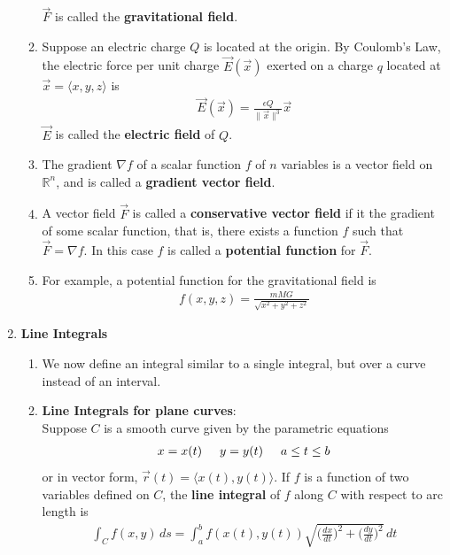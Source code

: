 \documentclass[10pt]{article}
\begin{document}
\begin{multicols*}{2}
\begin{enumerate}
\begin{enumerate}
        $\vec{F}$ is called the \textbf{gravitational field}.
        \item Suppose an electric charge $Q$ is located at the origin. By Coulomb's Law, the electric force per unit charge $\vec{E}(\vec{x})$ exerted on a charge $q$ located at $\vec{x} = \langle x,y,z \rangle$ is
        \begin{align*}
            \vec{E}(\vec{x}) = \frac{\epsilon Q}{\| \vec{x} \|^3} \vec{x}
        \end{align*}
        $\vec{E}$ is called the \textbf{electric field} of $Q$.
        \item The gradient $\nabla f$ of a scalar function $f$ of $n$ variables is a vector field on $\mathbb{R}^n$, and is called a \textbf{gradient vector field}.
        \item A vector field $\vec{F}$ is called a \textbf{conservative vector field} if it the gradient of some scalar function, that is, there exists a function $f$ such that $\vec{F} = \nabla f$. In this case $f$ is called a \textbf{potential function} for $\vec{F}$. 
        \item For example, a potential function for the gravitational field is
        \begin{align*}
            f(x,y,z) = \frac{mMG}{\sqrt{x^2 + y^2 + z^2}}
        \end{align*}
    \end{enumerate}
    \item \textbf{Line Integrals}
    \begin{enumerate}
        \item We now define an integral similar to a single integral, but over a curve instead of an interval. 
        \item \textbf{Line Integrals for plane curves}: \\ Suppose $C$ is a smooth curve given by the parametric equations
        \begin{align*}
            x=x(t) \hspace{5mm} y=y(t) \hspace{5mm} a \leq t \leq b
        \end{align*}
        or in vector form, $\vec{r}(t) = \langle x(t), y(t) \rangle$.
        If $f$ is a function of two variables defined on $C$, the \textbf{line integral} of $f$ along $C$ with respect to arc length is
        \begin{align*}
            \int_C f(x,y) \,ds = \int_a^b f(x(t), y(t)) \sqrt{ \biggl(\frac{dx}{dt}\biggr)^{\!2} + \biggl(\frac{dy}{dt}\biggr)^{\!2}} \, dt

\end{align*}
\end{enumerate}
\end{enumerate}
\end{multicols*}
\end{document}
